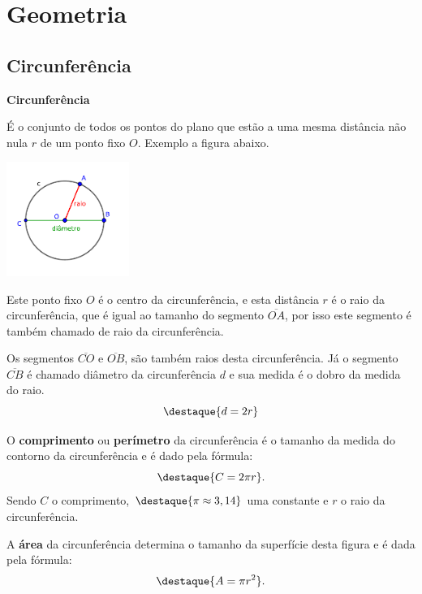 \chapter{Geometria}
\section{Circunferência}

\vskip0.3cm

\colorbox{azul}{
 \begin{minipage}{0.9\linewidth}
 \begin{center}
 \textbf{Circunferência}

  É o conjunto de todos os pontos do plano que estão a uma mesma distância não nula $r$ de um ponto fixo $O$. Exemplo a figura abaixo.
 \end{center}
 \end{minipage}}

 \vskip0.3cm

 \begin{center}
 \includegraphics[width=4cm]{../Topicos/Figuras/circunferencia.pdf}
 \end{center}

Este ponto fixo $O$ é o centro da circunferência, e esta distância $r$ é o raio da circunferência, que é igual ao tamanho do segmento $\overline{OA}$, por isso este segmento é também chamado de raio da circunferência.

Os segmentos $\overline{CO}$ e $\overline{OB}$, são também raios desta circunferência. Já o segmento $\overline{CB}$ é chamado diâmetro da circunferência $d$ e sua medida é o dobro da medida do raio.
\[\destaque{d= 2r}\]

O \textbf{comprimento} ou \textbf{perímetro} da circunferência é o tamanho da medida do contorno da circunferência e é dado pela fórmula:
\[\destaque{C= 2 \pi r} .\]
Sendo $C$ o comprimento, $\destaque{\pi \approx 3,14}$ uma constante e $r$ o raio da circunferência.

A \textbf{área} da circunferência determina o tamanho da superfície desta figura e é dada pela fórmula:
\[\destaque{A= \pi r^2} .\]


